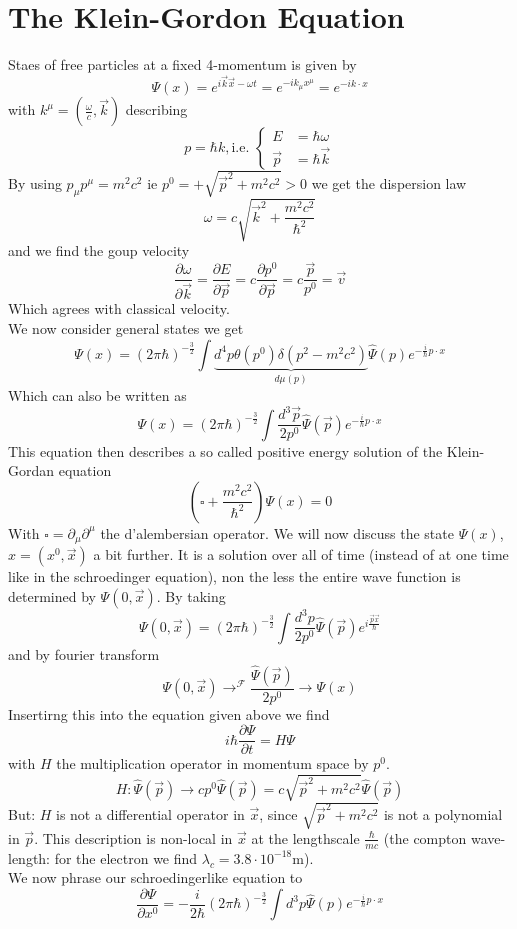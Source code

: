 \documentclass{report}
\begin{document}
\section{The Klein-Gordon Equation}
Staes of free particles at a fixed 4-momentum is given by \[
  \Psi\left( x \right) = e^{i\vec{k}\vec{x}- \omega t} = e^{-i k_\mu x^\mu} = e^{-i k \cdot x}
\] 
with $k^\mu = \left( \frac{\omega}{c}, \vec{k} \right) $ describing \[
p = \hbar k, \text{i.e. } \begin{cases}
  E &= \hbar \omega \\
  \vec{p} &= \hbar \vec{k}
\end{cases}
\] 
By using $p_\mu p^\mu = m^2c^2$ ie $p^0 = + \sqrt{\vec{p}^2 + m^2c^2} > 0$ we get the dispersion law \[
\omega = c \sqrt{\vec{k}^2 + \frac{m^2c^2}{\hbar^2}} 
\] and we find the goup velocity \[
\frac{\partial \omega }{\partial \vec{k} } = \frac{\partial E }{\partial \vec{p} } = c \frac{\partial p^0 }{\partial \vec{p} } = c \frac{\vec{p}}{p^0} = \vec{v} 
\] Which agrees with classical velocity.\\
We now consider general states we get \[
  \Psi\left( x \right) = \left( 2\pi \hbar \right) ^{-\frac{3}{2}} \int \underbrace{d^4p \theta\left( p^0 \right) \delta\left( p^2 - m^2c^2 \right)}_{d \mu\left( p \right)} \hat{\Psi}\left( p \right) e^{-\frac{i}{\hbar} p\cdot x}
\] Which can also be written as \[
\Psi\left( x \right) = (2 \pi \hbar)^{-\frac{3}{2}} \int \frac{d^3\vec{p}}{2 p^0} \hat{\Psi}\left( \vec{p} \right) e^{-\frac{i}{\hbar} p\cdot x}
\] This equation then describes a so called positive energy solution of the Klein-Gordan equation \[
\left( \square + \frac{m^2 c^2}{\hbar^2}  \right) \Psi\left( x \right) = 0
\] 
With $\square = \partial_\mu \partial^\mu  $ the d'alembersian operator.
We will now discuss the state $\Psi\left( x \right) $, $x = \left( x^0, \vec{x} \right) $ a bit further. It is a solution over all of time (instead of at one time like in the schroedinger equation), non the less the entire wave function is determined by $\Psi\left( 0, \vec{x} \right) $. By taking \[
  \Psi\left( 0, \vec{x} \right) = \left( 2 \pi \hbar \right) ^{-\frac{3}{2}} \int \frac{d^3 p}{2 p^0} \hat{\Psi}\left( \vec{p} \right) e^{i \frac{\vec{p} \vec{x}}{\hbar}}
\] and by fourier transform \[
\Psi\left( 0, \vec{x} \right) \to^{\mathcal{F}} \frac{\hat{\Psi}\left( \vec{p} \right) }{2 p^0} \to \Psi\left( x \right) 
\] 
Insertirng this into the equation given above we find \[
i\hbar \frac{\partial \Psi }{\partial t } = H \Psi
\] 
with $H$ the multiplication operator in momentum space by $p^ 0$. \[
  H: \hat{\Psi}\left( \vec{p} \right) \to c p^0 \hat{\Psi}\left( \vec{p} \right) = c \sqrt{\vec{p}^2 + m^2c^2} \hat{\Psi}\left( \vec{p} \right) 
\] 
But: $H$ is not a differential operator in  $\vec{x}$, since $\sqrt{\vec{p}^2 + m^2 c^2} $ is not a polynomial in $\vec{p}$. This description is non-local in $\vec{x}$ at the lengthscale $\frac{\hbar}{mc}$ (the compton wave-length: for the electron we find $\lambda_c = 3.8 \cdot 10^{-18}$m).\\
We now phrase our schroedingerlike equation to \[
  \frac{\partial \Psi }{\partial x^0 } = -\frac{i}{2 \hbar} \left( 2 \pi \hbar \right) ^{-\frac{3}{2}} \int d^3p \hat{\Psi}\left( p \right) e^{-\frac{i}{\hbar} p\cdot x}
\] 
\end{document}

